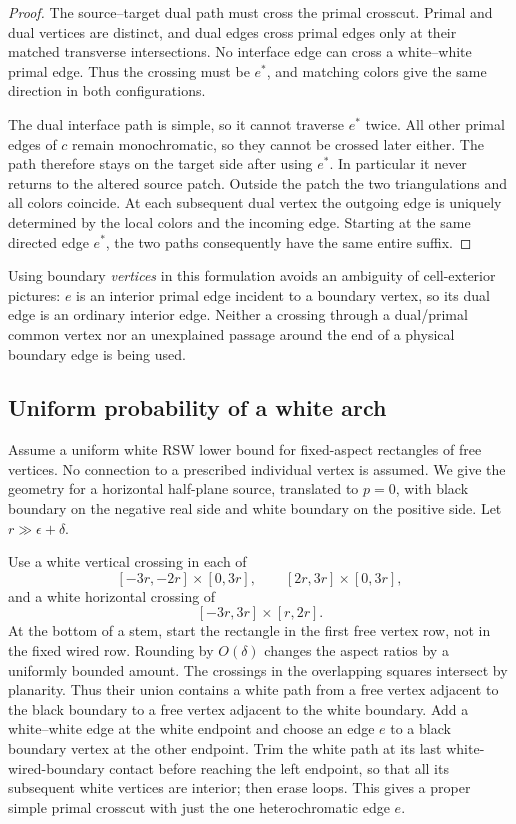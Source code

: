 \documentclass[11pt]{article}
\theoremstyle{definition}\newtheorem{definition}[theorem]{Definition}
\theoremstyle{remark}\newtheorem{remark}[theorem]{Remark}
\begin{document}
\begin{proof}
The source--target dual path must cross the primal crosscut. Primal and
dual vertices are distinct, and dual edges cross primal edges only at
their matched transverse intersections. No interface edge can cross a
white--white primal edge. Thus the crossing must be $e^*$, and matching
colors give the same direction in both configurations.

The dual interface path is simple, so it cannot traverse $e^*$ twice.
All other primal edges of $c$ remain monochromatic, so they cannot be
crossed later either. The path therefore stays on the target side after
using $e^*$. In particular it never returns to the altered source patch.
Outside the patch the two triangulations and all colors coincide.
At each subsequent dual vertex the outgoing edge is uniquely determined
by the local colors and the incoming edge. Starting at the same directed
edge $e^*$, the two paths consequently have the same entire suffix.
\end{proof}

Using boundary \emph{vertices} in this formulation avoids an ambiguity of
cell-exterior pictures: $e$ is an interior primal edge incident to a boundary
vertex, so its dual edge is an ordinary interior edge. Neither a crossing
through a dual/primal common vertex nor an unexplained passage around the
end of a physical boundary edge is being used.

\subsection{Uniform probability of a white arch}

Assume a uniform white RSW lower bound for fixed-aspect rectangles of free
vertices. No connection to a prescribed individual vertex is assumed.
We give the geometry for a horizontal half-plane source, translated to $p=0$,
with black boundary on the negative real side and white boundary on the
positive side. Let $r\gg\epsilon+\delta$.

Use a white vertical crossing in each of
\[
 [-3r,-2r]\times[0,3r],\qquad [2r,3r]\times[0,3r],
\]
and a white horizontal crossing of
\[
 [-3r,3r]\times[r,2r].
\]
At the bottom of a stem, start the rectangle in the first free vertex
row, not in the fixed wired row. Rounding by $O(\delta)$ changes the
aspect ratios by a uniformly bounded amount. The crossings in the
overlapping squares intersect by planarity. Thus their union contains a
white path from a free vertex adjacent to the black boundary to a free
vertex adjacent to the white boundary. Add a white--white edge at the
white endpoint and choose an edge $e$ to a black boundary vertex at the
other endpoint. Trim the white path at its last white-wired-boundary contact before reaching the left endpoint, so that all its subsequent white vertices are interior; then erase loops. This gives a proper simple primal crosscut with just the one heterochromatic edge $e$.
\end{document}
